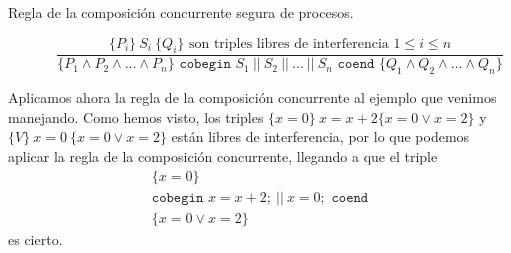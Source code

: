 \begin{description}
    \item [Regla de la composición concurrente segura de procesos.] 
        \begin{equation*}
            \dfrac{\{P_i\}\ S_i\ \{Q_i\} \text{\ son\ triples\ libres\ de\ interferencia\ } 1\leq i \leq n}{\{P_1 \land P_2 \land \ldots \land P_n\} \texttt{\ cobegin\ } S_1\ ||\ S_2\ ||\ \ldots\ ||\ S_n \texttt{\ coend\ } \{Q_1 \land Q_2 \land \ldots \land Q_n\}}
        \end{equation*}
\end{description}

\begin{ejemplo}
    Aplicamos ahora la regla de la composición concurrente al ejemplo que venimos manejando. Como hemos visto, los triples $\{x=0\}\ x=x+2\{x=0 \lor x=2\}$ y $\{V\}\ x=0\ \{x=0 \lor x=2\}$ están libres de interferencia, por lo que podemos aplicar la regla de la composición concurrente, llegando a que el triple
    \begin{gather*}
        \{x=0\} \\
        \texttt{cobegin } x=x+2;\ ||\ x=0; \texttt{ coend} \\
        \{x=0 \lor x=2\}
    \end{gather*}
    es cierto.
\end{ejemplo}

